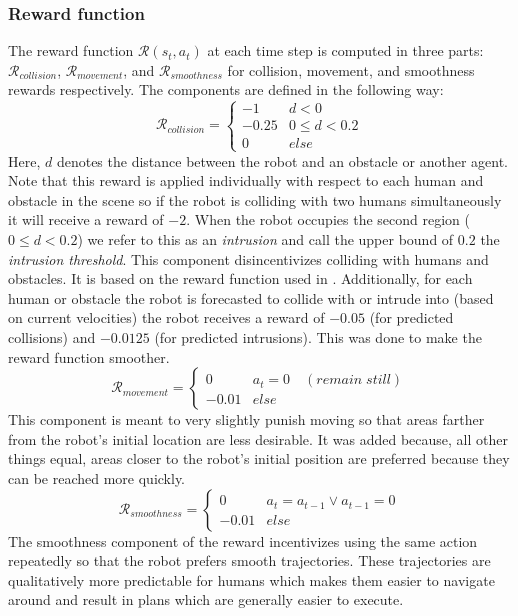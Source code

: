 \documentclass[letterpaper]{article}
\begin{document}
				\subsubsection{Reward function}
				The reward function $\mathcal{R}(s_t, a_t)$ at each time step is computed in three parts: $\mathcal{R}_{collision}$, $\mathcal{R}_{movement}$, and $\mathcal{R}_{smoothness}$ for collision, movement, and smoothness rewards respectively. The components are defined in the following way:
				\[
				\mathcal{R}_{collision} = \begin{cases}
				-1      &   d < 0\\
				-0.25   &   0 \leq d < 0.2\\
				0       &   else
				\end{cases}
				\]
				Here, $d$ denotes the distance between the robot and an obstacle or another agent. Note that this reward is applied individually with respect to each human and obstacle in the scene so if the robot is colliding with two humans simultaneously it will receive a reward of $-2$. When the robot occupies the second region ($0\leq d < 0.2$) we refer to this as an \textit{intrusion} and call the upper bound of $0.2$ the \textit{intrusion threshold}. This component disincentivizes colliding with humans and obstacles. It is based on the reward function used in \cite{crowdawarerl}. Additionally, for each human or obstacle the robot is forecasted to collide with or intrude into (based on current velocities) the robot receives a reward of $-0.05$ (for predicted collisions) and $-0.0125$ (for predicted intrusions). This was done to make the reward function smoother.
				\[
				\mathcal{R}_{movement} = \begin{cases}
				0       &   a_t = 0 \quad(remain\;still)\\
				-0.01   &   else
				\end{cases}
				\]
				This component is meant to very slightly punish moving so that areas farther from the robot's initial location are less desirable. It was added because, all other things equal, areas closer to the robot's initial position are preferred because they can be reached more quickly.
				\[
				\mathcal{R}_{smoothness} = \begin{cases}
				0       &   a_t = a_{t-1} \vee a_{t-1} = 0\\
				-0.01   &   else
				\end{cases}
				\]
				The smoothness component of the reward incentivizes using the same action repeatedly so that the robot prefers smooth trajectories. These trajectories are qualitatively more predictable for humans which makes them easier to navigate around and result in plans which are generally easier to execute.
				
\end{document}
